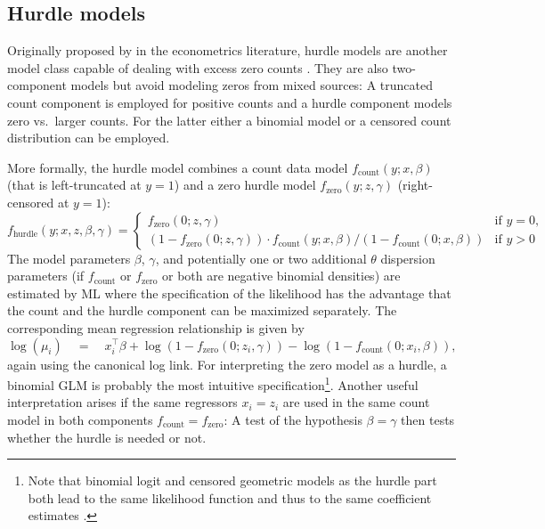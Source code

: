 \documentclass{Z}
\begin{document}
\subsection{Hurdle models}

Originally proposed by \cite{countreg:Mullahy:1986} in the econometrics literature,
hurdle models are another model class capable of dealing with excess zero counts 
\citep[see][for an overview]{countreg:Cameron+Trivedi:1998,countreg:Cameron+Trivedi:2005}.
They are also two-component models but avoid modeling zeros from mixed sources:
A truncated count component is employed for positive counts and
a hurdle component models zero vs.\ larger counts.
For the latter either a binomial model or a censored count distribution can be employed.

More formally, the hurdle model combines a count data model 
$f_\mathrm{count}(y; x, \beta)$ (that is left-truncated at $y = 1$) and a 
zero hurdle model $f_\mathrm{zero}(y; z, \gamma)$ (right-censored at $y = 1$):
\begin{equation} \label{eq:hurdle}
f_\mathrm{hurdle}(y; x, z, \beta, \gamma) =
  \left\{
  \begin{array}{ll}
  f_\mathrm{zero}(0; z, \gamma) & \mbox{if } y = 0, \\
  (1 - f_\mathrm{zero}(0; z, \gamma)) \cdot
  f_\mathrm{count}(y; x, \beta)/(1 - f_\mathrm{count}(0; x, \beta)) & \mbox{if } y > 0
  \end{array}
  \right.
\end{equation}
The model parameters $\beta$, $\gamma$, and potentially one or two additional
$\theta$ dispersion parameters
(if $f_\mathrm{count}$ or $f_\mathrm{zero}$ or both are negative binomial densities)
are estimated by ML where the specification of the likelihood has the advantage that
the count and the hurdle component can be maximized separately. The corresponding
mean regression relationship is given by
\begin{equation} \label{eq:hurdle-mean}
\log(\mu_i) \quad = \quad x_i^\top \beta +
                    \log(1 - f_\mathrm{zero}(0; z_i, \gamma)) -
		    \log(1 - f_\mathrm{count}(0; x_i, \beta)),
\end{equation}
again using the canonical log link.
For interpreting the zero model as a hurdle, a binomial GLM is probably the most 
intuitive specification\footnote{Note that
binomial logit and censored geometric models as the hurdle part both lead to 
the same likelihood function and thus to the same coefficient estimates \citep{countreg:Mullahy:1986}.}.
Another useful interpretation arises if the same regressors $x_i = z_i$ are
used in the same count model in both components $f_\mathrm{count} = f_\mathrm{zero}$: 
A test of the hypothesis $\beta = \gamma$ then tests whether the hurdle is
needed or not.
\end{document}
